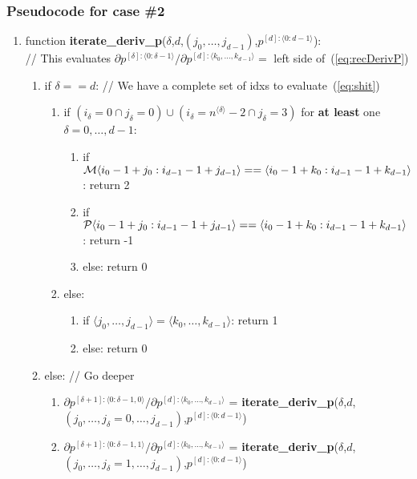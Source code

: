 \documentclass[11pt]{article}
\begin{document}

\subsubsection{Pseudocode for case \#2}


\begin{enumerate}
\item function \textbf{iterate\_deriv\_p}($\delta$,$d$,$(j_0, \dots, j_{d-1})$,$p^{[d]:\langle 0:d-1 \rangle}$): \\
// This evaluates $\partial p^{[\delta]:\langle 0: \delta -1 \rangle} / \partial p^{[d] : \langle k_0, \dots, k_{d-1} \rangle} = $ left side of~(\ref{eq:recDerivP})
\begin{enumerate}
\item if $\delta == d$: // We have a complete set of idxs to evaluate~(\ref{eq:shit})
\begin{enumerate}
\item if $(i_\delta=0 \cap j_\delta =0) \cup (i_\delta=n^{\langle \delta \rangle} -2 \cap j_\delta = 3)$ for \textbf{at least} one $\delta=0,\dots,d-1$:
\begin{enumerate}
\item if ${\cal M} \langle i_0 - 1 + j_0 : i_{d-1} - 1 + j_{d-1} \rangle == \langle i_0 - 1 + k_0 : i_{d-1} - 1 + k_{d-1} \rangle$: return 2
\item if ${\cal P} \langle i_0 - 1 + j_0 : i_{d-1} - 1 + j_{d-1} \rangle == \langle i_0 - 1 + k_0 : i_{d-1} - 1 + k_{d-1} \rangle$: return -1
\item else: return 0
\end{enumerate}
\item else:
\begin{enumerate}
\item if $\langle j_0, \dots, j_{d-1} \rangle = \langle k_0, \dots, k_{d-1} \rangle$: return 1
\item else: return 0
\end{enumerate}
\end{enumerate}
\item else: // Go deeper
\begin{enumerate}
\item $\partial p^{[\delta+1]:\langle 0: \delta-1, 0 \rangle} / \partial p^{[d] : \langle k_0, \dots, k_{d-1} \rangle}$ = \textbf{iterate\_deriv\_p}($\delta$,$d$,$(j_0, \dots, j_\delta=0, \dots, j_{d-1})$,$p^{[d]:\langle 0:d-1 \rangle}$)
\item $\partial p^{[\delta+1]:\langle 0: \delta-1, 1 \rangle} / \partial p^{[d] : \langle k_0, \dots, k_{d-1} \rangle}$ = \textbf{iterate\_deriv\_p}($\delta$,$d$,$(j_0, \dots, j_\delta=1, \dots, j_{d-1})$,$p^{[d]:\langle 0:d-1 \rangle}$)

\end{enumerate}
\end{enumerate}
\end{enumerate}
\end{document}
